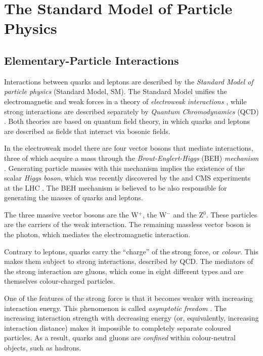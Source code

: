 \section{The Standard Model of Particle Physics}
\label{sec:intro_SM}

\subsection{Elementary-Particle Interactions}
\label{subsec:intro_SM_int}

Interactions between quarks and leptons are described by the \emph{Standard Model of particle physics} (Standard Model, SM). The Standard
Model unifies the electromagnetic and weak forces in a theory of \emph{electroweak interactions}
\cite{Glashow:1961tr,*Weinberg:1967tq,*Salam:1968rm}, while strong interactions are described separately by \emph{Quantum Chromodynamics}
(QCD) \cite{Fritzsch:1973pi}. Both theories are based on quantum field theory, in which quarks and leptons are described as fields that
interact via bosonic fields.

In the electroweak model there are four vector bosons that mediate interactions, three of which acquire a mass through the
\emph{Brout-Englert-Higgs} (BEH) \emph{mechanism} \cite{Englert:1964et,*Higgs:1964ia,*Higgs:1964pj,*Guralnik:1964eu}. Generating particle
masses with this mechanism implies the existence of the scalar \emph{Higgs boson}, which was recently discovered by the \atlas{} and
CMS experiments at the LHC \cite{Aad:2012tfa,*Chatrchyan:2012ufa}. The BEH mechanism is believed to be also responsible for generating the
masses of quarks and leptons.

The three massive vector bosons are the W$^+$, the W$^-$ and the Z$^0$. These particles are the carriers of the weak interaction. The
remaining massless vector boson is the photon, which mediates the electromagnetic interaction.

Contrary to leptons, quarks carry the ``charge'' of the strong force, or \emph{colour}. This makes them subject to strong interactions,
described by QCD. The mediators of the strong interaction are gluons, which come in eight different types and are themselves colour-charged
particles.

One of the features of the strong force is that it becomes weaker with increasing interaction energy. This phenomenon is called
\emph{asymptotic freedom} \cite{Gross:1973id,*Politzer:1973fx}. The increasing interaction strength with decreasing energy (or,
equivalently, increasing interaction distance) makes it impossible to completely separate coloured particles. As a result, quarks and
gluons are \emph{confined} within colour-neutral objects, such as hadrons.

